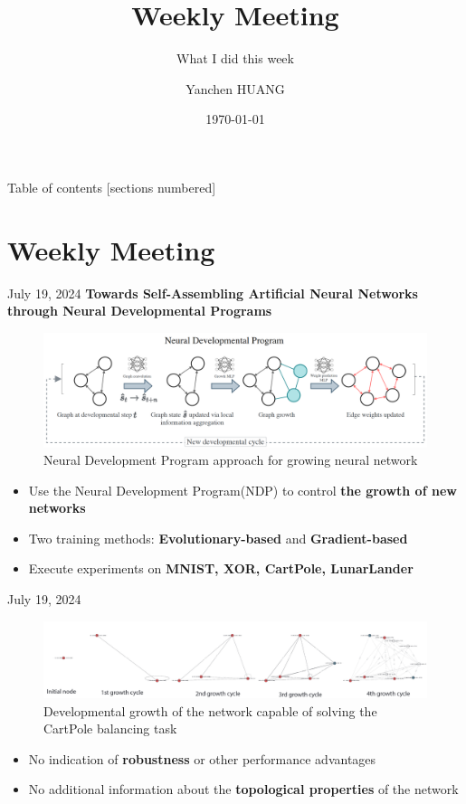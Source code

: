 \documentclass[10pt]{beamer}
\title{Weekly Meeting}
\subtitle{What I did this week}
\date{\today}
\author{Yanchen HUANG}
\institute{Westlake University}
\begin{document}
\maketitle

\begin{frame}{Table of contents}
  [sections numbered]
  \tableofcontents[hideallsubsections]
\end{frame}

\section{Weekly Meeting}

\begin{frame}[fragile]{July 19, 2024}
\textbf{Towards Self-Assembling Artificial Neural Networks through Neural Developmental Programs}
\begin{figure}
    \centering
    \includegraphics[width=\textwidth]{Fig/2024.7.19_1.png}
    \caption{Neural Development Program approach for growing neural network}
    \label{fig:my_label}
\end{figure}
\begin{itemize}
    \item Use the Neural Development Program(NDP) to control \textbf{the growth of new networks}
    \item Two training methods: \textbf{Evolutionary-based} and \textbf{Gradient-based}
    \item Execute experiments on \textbf{MNIST, XOR, CartPole, LunarLander}
\end{itemize}
\end{frame}

\begin{frame}{July 19, 2024}
    \begin{figure}
        \centering
        \includegraphics[width=\textwidth]{Fig/2024.7.19_2.png}
        \caption{Developmental growth of the network capable of solving the CartPole balancing task}
        \label{fig:my_label}
    \end{figure}
    \begin{itemize}
        \item No indication of \textbf{robustness} or other performance advantages
        \item No additional information about the \textbf{topological properties} of the network
    \end{itemize}
\end{frame}
\end{document}
